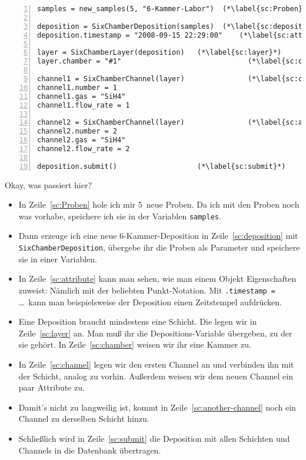 \documentclass[german,11pt]{article}
\begin{document}
\begin{lstlisting}[numbers=left]
samples = new_samples(5, "6-Kammer-Labor")  (*\label{sc:Proben}*)

deposition = SixChamberDeposition(samples)  (*\label{sc:deposition}*)
deposition.timestamp = "2008-09-15 22:29:00"    (*\label{sc:attribute}*)

layer = SixChamberLayer(deposition)   (*\label{sc:layer}*)
layer.chamber = "#1"                              (*\label{sc:chamber}*)

channel1 = SixChamberChannel(layer)               (*\label{sc:channel}*)
channel1.number = 1
channel1.gas = "SiH4"
channel1.flow_rate = 1

channel2 = SixChamberChannel(layer)               (*\label{sc:another-channel}*)
channel2.number = 2
channel2.gas = "SiH4"
channel2.flow_rate = 2

deposition.submit()                   (*\label{sc:submit}*)
\end{lstlisting}

Okay, was passiert hier?\bigskip

\begin{itemize}
\item In Zeile~\ref{sc:Proben} hole ich mir 5~neue Proben.  Da ich mit den
  Proben noch was vorhabe, speichere ich sie in der Variablen
  \lstinline|samples|.
\item Dann erzeuge ich eine neue 6-Kammer-Deposition in
  Zeile~\ref{sc:deposition} mit \lstinline|SixChamberDeposition|, übergebe ihr
  die Proben als Parameter und speichere sie in einer Variablen.
\item In Zeile~\ref{sc:attribute} kann man sehen, wie man einem Objekt
  Eigenschaften zuweist: Nämlich mit der beliebten Punkt-Notation.  Mit
  \lstinline|.timestamp = |…\ kann man beispielsweise der Deposition einen
  Zeitstempel aufdrücken.
\item Eine Deposition braucht mindestens eine Schicht.  Die legen wir in
  Zeile~\ref{sc:layer} an.  Man muß ihr die Depositions-Variable übergeben, zu
  der sie gehört.  In Zeile~\ref{sc:chamber} weisen wir ihr eine Kammer zu.
\item In Zeile~\ref{sc:channel} legen wir den ersten Channel an und verbinden
  ihn mit der Schicht, analog zu vorhin.  Außerdem weisen wir dem neuen Channel
  ein paar Attribute zu.
\item Damit's nicht zu langweilig ist, kommt in Zeile~\ref{sc:another-channel}
  noch ein Channel zu derselben Schicht hinzu.
\item Schließlich wird in Zeile~\ref{sc:submit} die Deposition mit allen
  Schichten und Channels in die Datenbank übertragen. 
\end{itemize}
\end{document}
